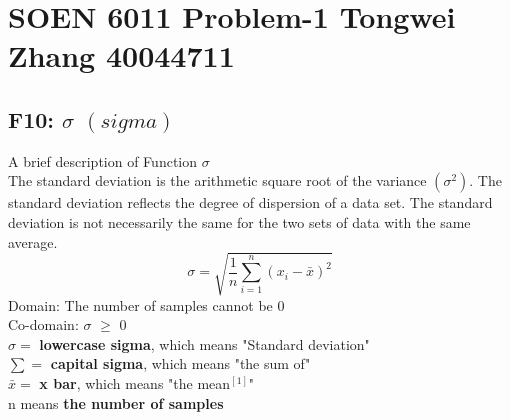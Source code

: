 \documentclass[12pt]{report}
\begin{document}
\section*{SOEN 6011 Problem-1 Tongwei Zhang  40044711}
\vspace{-0.4cm}
\subsection*{F10: $\sigma$  $(sigma)$}
\vspace{-0.3cm}
A brief description of Function $\sigma$ \\
The standard deviation is the arithmetic square root of the variance $(\sigma^2)$. The standard deviation reflects the degree of dispersion of a data set. The standard deviation is not necessarily the same for the two sets of data with the same average.
   $$\sigma=\sqrt{\frac{1}{n}{\sum_{i=1}^n(x_i-\bar{x})^2}}$$
Domain: The number of samples cannot be 0\\
Co-domain: $\sigma$ $\geq$ 0\\
$\sigma =$ \textbf{lowercase sigma}, which means "Standard deviation"\\
$\sum =$ \textbf{capital sigma}, which means "the sum of"\\
$\bar{x} =$ \textbf{x bar}, which means "the mean$^{[1]}$"\\
n means \textbf{the number of samples}\\
\vspace{-0.4cm}
\begin{center}
\end{center}
\end{document}
